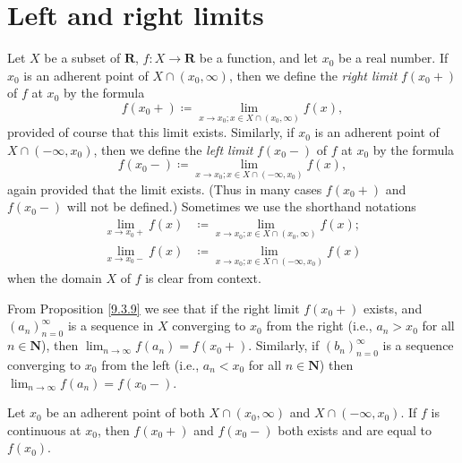 \section{Left and right limits}\label{sec 9.5}

\begin{definition}\label{9.5.1}
    Let \(X\) be a subset of \(\mathbf{R}\), \(f : X \to \mathbf{R}\) be a function, and let \(x_0\) be a real number.
    If \(x_0\) is an adherent point of \(X \cap (x_0, \infty)\), then we define the \emph{right limit} \(f(x_0+)\) of \(f\) at \(x_0\) by the formula
    \[
        f(x_0+) \coloneqq \lim_{x \to x_0 ; x \in X \cap (x_0, \infty)} f(x),
    \]
    provided of course that this limit exists.
    Similarly, if \(x_0\) is an adherent point of \(X \cap (-\infty, x_0)\), then we define the \emph{left limit} \(f(x_0-)\) of \(f\) at \(x_0\) by the formula
    \[
        f(x_0-) \coloneqq \lim_{x \to x_0 ; x \in X \cap (-\infty, x_0)} f(x),
    \]
    again provided that the limit exists.
    (Thus in many cases \(f(x_0+)\) and \(f(x_0-)\) will not be defined.)
    Sometimes we use the shorthand notations
    \begin{align*}
        \lim_{x \to x_0+} f(x) & \coloneqq \lim_{x \to x_0 ; x \in X \cap (x_0, \infty)} f(x); \\
        \lim_{x \to x_0-} f(x) & \coloneqq \lim_{x \to x_0 ; x \in X \cap (-\infty, x_0)} f(x)
    \end{align*}
    when the domain \(X\) of \(f\) is clear from context.
\end{definition}

\begin{note}
    From Proposition \ref{9.3.9} we see that if the right limit \(f(x_0+)\) exists, and \((a_n)_{n = 0}^\infty\) is a sequence in \(X\) converging to \(x_0\) from the right (i.e., \(a_n > x_0\) for all \(n \in \mathbf{N}\)), then \(\lim_{n \to \infty} f(a_n) = f(x_0+)\).
    Similarly, if \((b_n)_{n = 0}^\infty\) is a sequence converging to \(x_0\) from the left (i.e., \(a_n < x_0\) for all \(n \in \mathbf{N}\)) then \(\lim_{n \to \infty} f(a_n) = f(x_0-)\).
\end{note}

\begin{additional corollary}\label{ac 9.5.1}
Let \(x_0\) be an adherent point of both \(X \cap (x_0, \infty)\) and \(X \cap (-\infty, x_0)\).
If \(f\) is continuous at \(x_0\), then \(f(x_0+)\) and \(f(x_0-)\) both exists and are equal to \(f(x_0)\).
\end{additional corollary}

